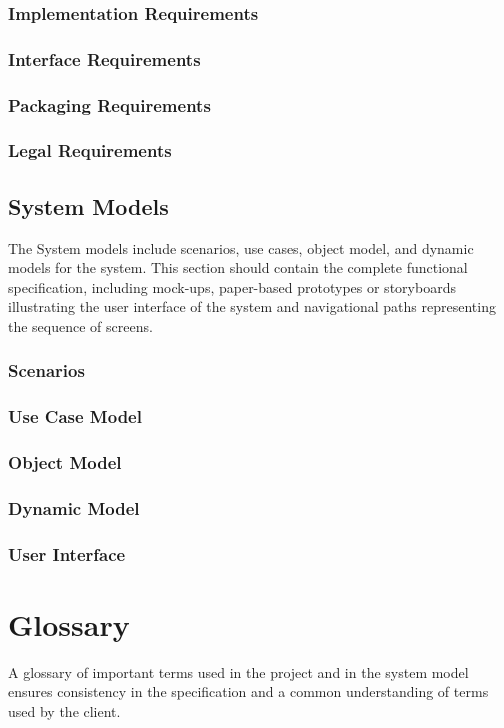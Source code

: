 \documentclass[a4paper,12pt]{scrartcl}
\newenvironment{subs}
  {\adjustwidth{3em}{0pt}}
  {\endadjustwidth}
\newenvironment{subsubs}
  {\adjustwidth{2em}{0pt}}
  {\endadjustwidth}
\begin{document}
\begin{subs}
\begin{subsubs}
\subsubsection{Implementation Requirements}
\subsubsection{Interface Requirements}
\subsubsection{Packaging Requirements}
\subsubsection{Legal Requirements}
\end{subsubs}

\subsection{System Models}
The System models include scenarios, use cases, object model, and dynamic models for the system. This section should contain the complete functional specification, including mock-ups, paper-based prototypes or storyboards illustrating the user interface of the system and navigational paths representing the sequence of screens.
\begin{subsubs}
\subsubsection{Scenarios}
\subsubsection{Use Case Model}
\subsubsection{Object Model}
\subsubsection{Dynamic Model}
\subsubsection{User Interface}
\end{subsubs}
\end{subs}

\section{Glossary}
A glossary of important terms used in the project and in the system model ensures consistency in the specification and a common understanding of terms used by the client.
\end{document}
